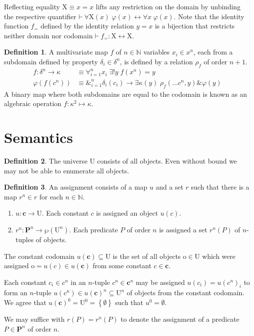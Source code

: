 \documentclass{amsbook}
\newcommand{\setsm}[1]{\left\{#1\right\}}
\newcommand{\theorem}{\mathord\vdash\medspace}
\newcommand{\univ}[1]{\mathord\forall#1\;}
\newcommand{\exis}[1]{\mathord\exists#1\;}
\newcommand{\then}{\mathrel\rightarrow}
\newcommand{\conj}{\mathrel\&}
\newcommand{\eqv}{\mathrel\leftrightarrow}
\theoremstyle{definition}
\newtheorem{dfn}{Definition}[section]
\begin{document}
Reflecting equality $\mathrm X \equiv x = x$ lifts any restriction on the domain by unbinding the respective quantifier $\theorem \univ{\mathrm X(x)}\varphi(x) \eqv \univ x \varphi(x)$. Note that the identity function $f_{\mathord=}$ defined by the identity relation $y = x$ is a bijection that restricts neither domain nor codomain $\theorem f_{\mathord=}: \mathrm X \longleftrightarrow \mathrm X$.

\begin{dfn}
    A multivariate map $f$ of $n \in \mathbb N$ variables $x_i \in x^n$, each from a subdomain defined by property $\delta_i \in \delta^n$, is defined by a relation $\rho_f$ of order $n+1$.
    $$\begin{aligned}
            f: \delta^n \longrightarrow \kappa & \equiv \forall_{i=1}^n{x_i}\; \exis{!y} f(x^n) = y                                           \\
            \varphi(f(c^n))                    & \equiv \&_{i=1}^n \delta_i(c_i) \then \exis{\kappa(y)} \rho_f(\dots c^n, y) \conj \varphi(y)
        \end{aligned}$$
    A binary map where both subdomains are equal to the codomain is known as an algebraic operation $f: \kappa^2 \longmapsto \kappa$.
\end{dfn}

\section{Semantics}

\begin{dfn}
    The universe $\mathrm U$ consists of all objects. Even without bound we may not be able to enumerate all objects.
\end{dfn}

\begin{dfn}
    An assignment consists of a map $u$ and a set $r$ such that there is a map $r^n \in r$ for each $n \in \mathbb N$.
    \begin{enumerate}
        \item $u: \mathbf c \longrightarrow \mathrm U$.
              Each constant $c$ is assigned an object $u(c)$.
        \item $r^n: \mathbf P^n \longrightarrow \wp(\mathrm U^n)$.
              Each predicate $P$ of order $n$ is assigned a set $r^n(P)$ of $n$-tuples of objects.
    \end{enumerate}

    The constant codomain $u(\mathbf c) \subseteq \mathrm U$ is the set of all objects $\mathrm o \in \mathrm U$ which were assigned $\mathrm o = u(c) \in u(\mathbf c)$ from some constant $c \in \mathbf c$.

    Each constant $c_i \in c^n$ in an $n$-tuple $c^n \in \mathbf c^n$ may be assigned $u(c_i) = u(c^n)_i$ to form an $n$-tuple $u(c^n) \in u(\mathbf c)^n \subseteq \mathrm U^n$ of objects from the constant codomain. We agree that $u(\mathbf c)^0 = \mathrm U^0 = \setsm{\emptyset}$ such that $u^0 = \emptyset$.

    We may suffice with $r(P) = r^n(P)$ to denote the assignment of a predicate $P \in \mathbf P^n$ of order $n$.
\end{dfn}
\end{document}

